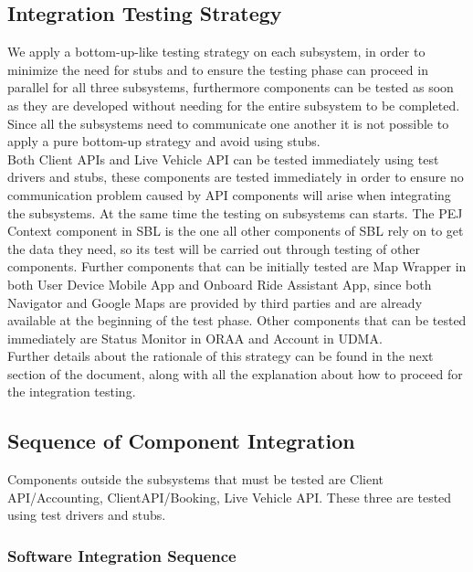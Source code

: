\subsection{Integration Testing Strategy}
We apply a bottom-up-like testing strategy on each subsystem, in order to minimize the need for stubs and to ensure the testing phase can proceed in parallel for all three subsystems, furthermore components can be tested as soon as they are developed without needing for the entire subsystem to be completed. Since all the subsystems need to communicate one another it is not possible to apply a pure bottom-up strategy and avoid using stubs.\\
Both Client APIs and Live Vehicle API can be tested immediately using test drivers and stubs, these components are tested immediately in order to ensure no communication problem caused by API components will arise when integrating the subsystems. At the same time the testing on subsystems can starts. The PEJ Context component in SBL is the one all other components of SBL rely on to get the data they need, so its test will be carried out through testing of other components. Further components that can be initially tested are Map Wrapper in both User Device Mobile App and Onboard Ride Assistant App, since both Navigator and Google Maps are provided by third parties and are already available at the beginning of the test phase. Other components that can be tested immediately are Status Monitor in ORAA and Account in UDMA.\\
Further details about the rationale of this strategy can be found in the next section of the document, along with all the explanation about how to proceed for the integration testing.


\subsection{Sequence of Component Integration}
Components outside the subsystems that must be tested are Client API/Accounting, ClientAPI/Booking, Live Vehicle API. These three are tested using test drivers and stubs.


\subsubsection{Software Integration Sequence}

